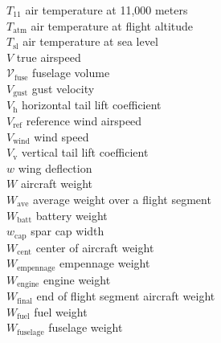 \begin{multicols}{2}
\begin{tabbing}
$T_{11}$ \> air temperature at 11,000 meters \\ %
$T_{\text{atm}}$ \> air temperature at flight altitude \\ %
$T_{\text{sl}}$ \> air temperature at sea level \\ %
$V$ \> true airspeed \\ %
$\mathcal{V}_{\text{fuse}}$ \>  fuselage volume \\ %
$V_{\text{gust}}$ \>  gust velocity \\ %
$V_{\text{h}}$ \> horizontal tail lift coefficient \\
$V_{\text{ref}}$ \>  reference wind airspeed \\ %
$V_{\text{wind}}$ \>  wind speed \\ %
$V_{\text{v}}$ \> vertical tail lift coefficient \\
$w$ \> wing deflection \\ %
$W$ \> aircraft weight \\ %
$W_{\text{ave}}$ \> average weight over a flight segment \\ %
$W_{\text{batt}}$ \> battery weight \\ %
$w_{\text{cap}}$ \> spar cap width \\ %
$W_{\text{cent}}$ \> center of aircraft weight \\ %
$W_{\text{empennage}}$ \> empennage weight \\ %
$W_{\text{engine}}$ \> engine weight \\ %
$W_{\text{final}}$ \> end of flight segment aircraft weight \\ %
$W_{\text{fuel}}$ \> fuel weight \\ %
$W_{\text{fuselage}}$ \> fuselage weight \\ %

\end{tabbing}
\end{multicols}
